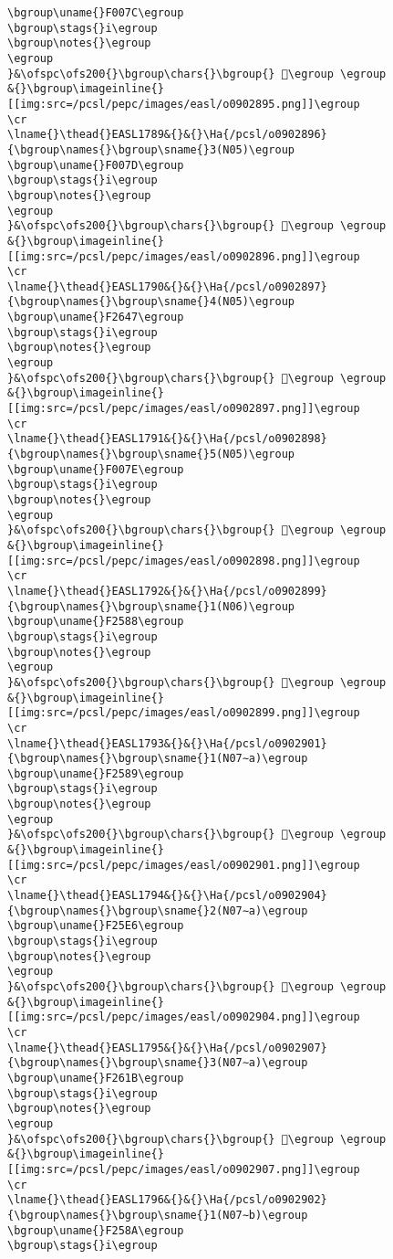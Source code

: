 \begin{verbatim}
\bgroup\uname{}F007C\egroup
\bgroup\stags{}i\egroup
\bgroup\notes{}\egroup
\egroup
}&\ofspc\ofs200{}\bgroup\chars{}\bgroup{} 󰁼\egroup \egroup
&{}\bgroup\imageinline{}[[img:src=/pcsl/pepc/images/easl/o0902895.png]]\egroup
\cr
\lname{}\thead{}EASL1789&{}&{}\Ha{/pcsl/o0902896}{\bgroup\names{}\bgroup\sname{}3(N05)\egroup
\bgroup\uname{}F007D\egroup
\bgroup\stags{}i\egroup
\bgroup\notes{}\egroup
\egroup
}&\ofspc\ofs200{}\bgroup\chars{}\bgroup{} 󰁽\egroup \egroup
&{}\bgroup\imageinline{}[[img:src=/pcsl/pepc/images/easl/o0902896.png]]\egroup
\cr
\lname{}\thead{}EASL1790&{}&{}\Ha{/pcsl/o0902897}{\bgroup\names{}\bgroup\sname{}4(N05)\egroup
\bgroup\uname{}F2647\egroup
\bgroup\stags{}i\egroup
\bgroup\notes{}\egroup
\egroup
}&\ofspc\ofs200{}\bgroup\chars{}\bgroup{} 󲙇\egroup \egroup
&{}\bgroup\imageinline{}[[img:src=/pcsl/pepc/images/easl/o0902897.png]]\egroup
\cr
\lname{}\thead{}EASL1791&{}&{}\Ha{/pcsl/o0902898}{\bgroup\names{}\bgroup\sname{}5(N05)\egroup
\bgroup\uname{}F007E\egroup
\bgroup\stags{}i\egroup
\bgroup\notes{}\egroup
\egroup
}&\ofspc\ofs200{}\bgroup\chars{}\bgroup{} 󰁾\egroup \egroup
&{}\bgroup\imageinline{}[[img:src=/pcsl/pepc/images/easl/o0902898.png]]\egroup
\cr
\lname{}\thead{}EASL1792&{}&{}\Ha{/pcsl/o0902899}{\bgroup\names{}\bgroup\sname{}1(N06)\egroup
\bgroup\uname{}F2588\egroup
\bgroup\stags{}i\egroup
\bgroup\notes{}\egroup
\egroup
}&\ofspc\ofs200{}\bgroup\chars{}\bgroup{} 󲖈\egroup \egroup
&{}\bgroup\imageinline{}[[img:src=/pcsl/pepc/images/easl/o0902899.png]]\egroup
\cr
\lname{}\thead{}EASL1793&{}&{}\Ha{/pcsl/o0902901}{\bgroup\names{}\bgroup\sname{}1(N07∼a)\egroup
\bgroup\uname{}F2589\egroup
\bgroup\stags{}i\egroup
\bgroup\notes{}\egroup
\egroup
}&\ofspc\ofs200{}\bgroup\chars{}\bgroup{} 󲖉\egroup \egroup
&{}\bgroup\imageinline{}[[img:src=/pcsl/pepc/images/easl/o0902901.png]]\egroup
\cr
\lname{}\thead{}EASL1794&{}&{}\Ha{/pcsl/o0902904}{\bgroup\names{}\bgroup\sname{}2(N07∼a)\egroup
\bgroup\uname{}F25E6\egroup
\bgroup\stags{}i\egroup
\bgroup\notes{}\egroup
\egroup
}&\ofspc\ofs200{}\bgroup\chars{}\bgroup{} 󲗦\egroup \egroup
&{}\bgroup\imageinline{}[[img:src=/pcsl/pepc/images/easl/o0902904.png]]\egroup
\cr
\lname{}\thead{}EASL1795&{}&{}\Ha{/pcsl/o0902907}{\bgroup\names{}\bgroup\sname{}3(N07∼a)\egroup
\bgroup\uname{}F261B\egroup
\bgroup\stags{}i\egroup
\bgroup\notes{}\egroup
\egroup
}&\ofspc\ofs200{}\bgroup\chars{}\bgroup{} 󲘛\egroup \egroup
&{}\bgroup\imageinline{}[[img:src=/pcsl/pepc/images/easl/o0902907.png]]\egroup
\cr
\lname{}\thead{}EASL1796&{}&{}\Ha{/pcsl/o0902902}{\bgroup\names{}\bgroup\sname{}1(N07∼b)\egroup
\bgroup\uname{}F258A\egroup
\bgroup\stags{}i\egroup

\end{verbatim}
